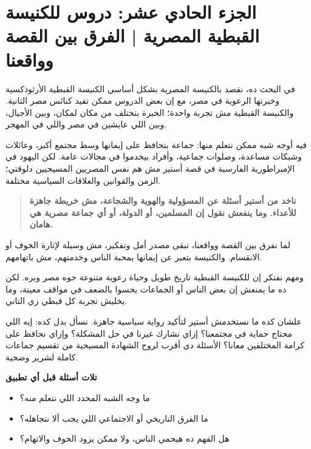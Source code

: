 \documentclass[12pt,a4paper]{article}
\begin{document}
\section*{الجزء الحادي عشر: دروس للكنيسة القبطية المصرية | الفرق بين القصة وواقعنا}
في البحث ده، نقصد بالكنيسة المصرية بشكل أساسي الكنيسة القبطية الأرثوذكسية وخبرتها الرعوية في مصر، مع إن بعض الدروس ممكن تفيد كنائس مصر التانية. والكنيسة القبطية مش تجربة واحدة؛ الخبرة بتختلف من مكان لمكان، وبين الأجيال، وبين اللي عايشين في مصر واللي في المهجر.\par\medskip
فيه أوجه شبه ممكن نتعلم منها: جماعة بتحافظ على إيمانها وسط مجتمع أكبر، وعائلات وشبكات مساعدة، وصلوات جماعية، وأفراد بيخدموا في مجالات عامة. لكن اليهود في الإمبراطورية الفارسية في قصة أستير مش هم نفس المصريين المسيحيين دلوقتي؛ الزمن والقوانين والعلاقات السياسية مختلفة.\par\medskip
\begin{quote}\colorbox{soft}{\parbox{0.94\linewidth}{\textbf{ناخد من أستير أسئلة عن المسؤولية والهوية والشجاعة، مش خريطة جاهزة للأعداء. وما ينفعش نقول إن المسلمين، أو الدولة، أو أي جماعة مصرية هي هامان.}}}\end{quote}
لما نفرق بين القصة وواقعنا، تبقى مصدر أمل وتفكير، مش وسيلة لإثارة الخوف أو الانقسام. والكنيسة بتعبر عن إيمانها بمحبة الناس وخدمتهم، مش باتهامهم.\par\medskip
ومهم نفتكر إن للكنيسة القبطية تاريخ طويل وحياة رعوية متنوعة جوه مصر وبره. لكن ده ما يمنعش إن بعض الناس أو الجماعات يحسوا بالضعف في مواقف معينة، وما يخليش تجربة كل قبطي زي التاني.\par\medskip
علشان كده ما نستخدمش أستير لتأكيد رواية سياسية جاهزة. نسأل بدل كده: إيه اللي محتاج حماية في مجتمعنا؟ إزاي نشارك غيرنا في حل المشكلة؟ وإزاي نحافظ على كرامة المختلفين معانا؟ الأسئلة دي أقرب لروح الشهادة المسيحية من تقسيم جماعات كاملة لشرير وضحية.\par\medskip
\vspace{0.2em}\noindent\textcolor{ochre}{\textbf{تلات أسئلة قبل أي تطبيق}}\par\smallskip
\begin{itemize}[rightmargin=1.2em,leftmargin=0.5em,itemsep=0.25em,topsep=0.2em]
\item ما وجه الشبه المحدد اللي نتعلم منه؟
\item ما الفرق التاريخي أو الاجتماعي اللي يجب ألا نتجاهله؟
\item هل الفهم ده هيحمي الناس، ولا ممكن يزود الخوف والاتهام؟
\end{itemize}\medskip
\clearpage
\clearpage
\end{document}
